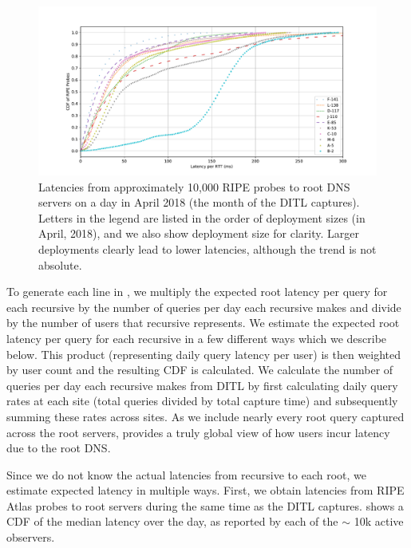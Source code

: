 \documentclass[sigconf,letterpaper,nonacm,10pt,anonymous]{acmart}
\begin{document}
\begin{figure}
    \centering
    \includegraphics[width=\linewidth]{figures/ripe_root_latencies.pdf}
    \caption{Latencies from approximately 10,000 RIPE probes to root DNS servers on a day in April 2018 (the month of the DITL captures). Letters in the legend are listed in the order of deployment sizes (in April, 2018), and we also show deployment size for clarity. Larger deployments clearly lead to lower latencies, although the trend is not absolute.}
    \label{fig:ripe_root_latencies}
\end{figure}

To generate each line in , we
multiply the expected root latency per query for each recursive by the
number of queries per day each recursive makes and divide by the number
of users that recursive represents. We estimate the expected root
latency per query for each recursive in a few different ways which we
describe below. This product (representing daily query latency per user)
is then weighted by user count and the resulting CDF is calculated. We
calculate the number of queries per day each recursive makes from DITL
by first calculating daily query rates at each site (\ie total queries
divided by total capture time) and subsequently summing these rates
across sites. As we include nearly every root query captured across the
root servers,  provides a truly
global view of how users incur latency due to the root DNS.

Since we do not know the actual latencies from recursive to each root,
we estimate expected latency in multiple ways. First, we obtain
latencies from RIPE Atlas probes to root servers during the same time as
the DITL captures.  shows a CDF of the
median latency over the day, as reported by each of the \(\sim\) 10k
active observers.
\end{document}
